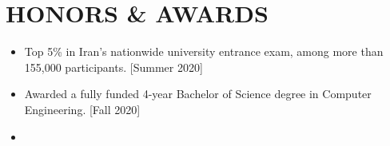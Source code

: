 \documentclass[11pt,a4paper,sans]{moderncv} %
\begin{document}
        
\section{HONORS \& AWARDS}
    \begin{itemize}
        \item  Top 5\% in Iran's nationwide university entrance exam, among more than 155,000 participants. \hfill[Summer 2020]
        \item Awarded a fully funded 4-year Bachelor of Science degree in Computer Engineering. [Fall 2020]
        \item 
    \end{itemize}
\end{document}
